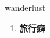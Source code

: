 
\begin{frame}
{\huge wanderlust}
\begin{center}
\begin{enumerate}\Large
  \item \textbf{旅行癖}
\end{enumerate}
\end{center}
\end{frame}

